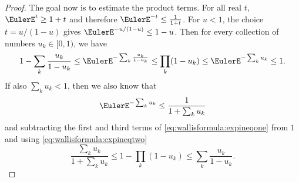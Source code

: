 \documentclass[12pt]{article}
\begin{document}
\begin{proof}
    The goal now is to estimate the product terms.  For all real \( t \),
    \( \EulerE^t \ge 1 + t \) and therefore \( \EulerE^{-t} \le \frac{1}
    {1 + t} \).  For \( u < 1 \), the choice \( t = u/(1-u) \) gives \(
    \EulerE^{-u/(1-u)} \le 1 - u \).  Then for every collection of
    numbers \( u_k \in [0,1) \), we have
    \begin{equation}
        \label{eq:wallisformula:expineqone} 1 - \sum_{k} \frac{u_k}{1-u_k}
        \le \EulerE^{-\sum_{k} \frac{u_k}{1-u_k}} \le \prod_{k} (1 - u_k)
        \le \EulerE^{-\sum_{k} u_k} \le 1.
    \end{equation}
    If also \( \sum_k u_k < 1 \), then we also know that
    \begin{equation}
        \label{eq:wallisformula:expineqtwo} \EulerE^{-\sum_{k} u_k} \le
        \frac{1}{1 + \sum_{k} u_k}
    \end{equation}
    and subtracting the first and third terms of \eqref{eq:wallisformula:expineqone}
    from \( 1 \) and using \eqref{eq:wallisformula:expineqtwo}
    \begin{equation}
        \label{eq:wallisfunction:sumprodineq} \frac{\sum_{k} u_k}{1 +
        \sum_{k} u_k} \le 1 - \prod_{k} (1 - u_k) \le \sum_{k} \frac{u_k}
        {1-u_k}.
    \end{equation}


\end{proof}
\end{document}
